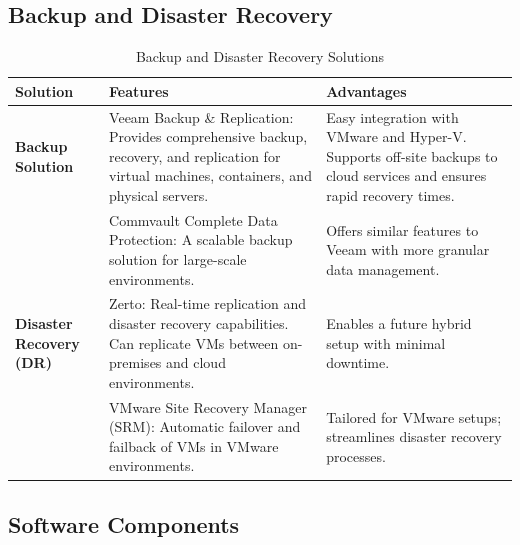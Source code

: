 \documentclass{llncs}
\begin{document}
\subsection{Backup and Disaster Recovery}
\begin{table}[H]
  \setlength{\tabcolsep}{5pt} %
  \renewcommand{\arraystretch}{1.2} %
  \centering
  \begin{tabular}{|p{3cm}|p{7cm}|p{5cm}|}
  \hline
  \textbf{Solution} & \textbf{Features} & \textbf{Advantages} \\
  \hline
  
  \textbf{Backup Solution} & 
  Veeam Backup \& Replication: Provides comprehensive backup, recovery, and replication for virtual machines, containers, and physical servers. & 
  Easy integration with VMware and Hyper-V. Supports off-site backups to cloud services and ensures rapid recovery times. \\
  \hline
  
  & Commvault Complete Data Protection: A scalable backup solution for large-scale environments. & 
  Offers similar features to Veeam with more granular data management. \\
  \hline
  
  \textbf{Disaster Recovery (DR)} & 
  Zerto: Real-time replication and disaster recovery capabilities. Can replicate VMs between on-premises and cloud environments. & 
  Enables a future hybrid setup with minimal downtime. \\
  \hline
  
  & VMware Site Recovery Manager (SRM): Automatic failover and failback of VMs in VMware environments. & 
  Tailored for VMware setups; streamlines disaster recovery processes. \\
  \hline
  
  \end{tabular}
  \caption{Backup and Disaster Recovery Solutions}
  \label{tab:backup_dr}
  \end{table}

\subsection{Software Components}
\end{document}
